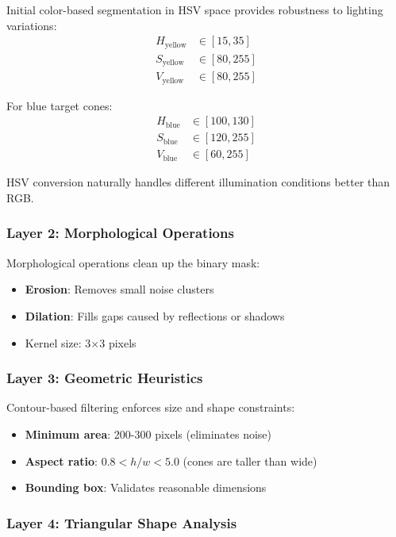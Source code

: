 \documentclass[11pt,a4paper]{article}
\begin{document}
Initial color-based segmentation in HSV space provides robustness to lighting variations:
\begin{align}
    H_{\text{yellow}} &\in [15, 35] \nonumber \\
    S_{\text{yellow}} &\in [80, 255] \nonumber \\
    V_{\text{yellow}} &\in [80, 255] \nonumber
\end{align}

For blue target cones:
\begin{align}
    H_{\text{blue}} &\in [100, 130] \nonumber \\
    S_{\text{blue}} &\in [120, 255] \nonumber \\
    V_{\text{blue}} &\in [60, 255] \nonumber
\end{align}

HSV conversion naturally handles different illumination conditions better than RGB.

\subsubsection{Layer 2: Morphological Operations}

Morphological operations clean up the binary mask:
\begin{itemize}
    \item \textbf{Erosion}: Removes small noise clusters
    \item \textbf{Dilation}: Fills gaps caused by reflections or shadows
    \item Kernel size: 3×3 pixels
\end{itemize}

\subsubsection{Layer 3: Geometric Heuristics}

Contour-based filtering enforces size and shape constraints:
\begin{itemize}
    \item \textbf{Minimum area}: 200-300 pixels (eliminates noise)
    \item \textbf{Aspect ratio}: $0.8 < h/w < 5.0$ (cones are taller than wide)
    \item \textbf{Bounding box}: Validates reasonable dimensions
\end{itemize}

\subsubsection{Layer 4: Triangular Shape Analysis}
\end{document}
